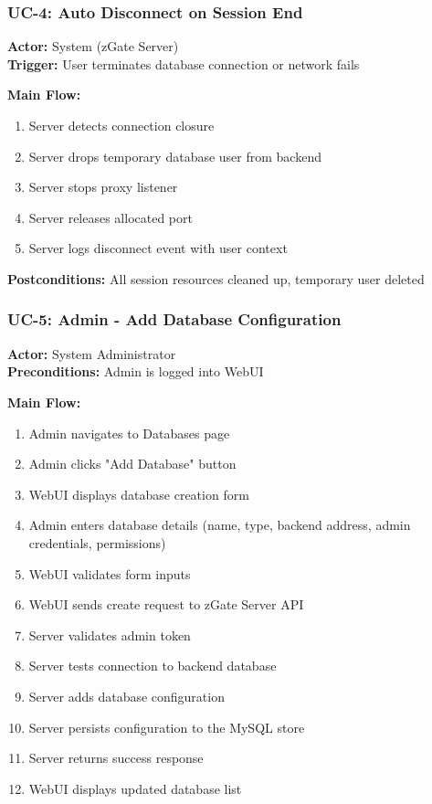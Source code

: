 \subsubsection{UC-4: Auto Disconnect on Session End}
\textbf{Actor:} System (zGate Server) \\
\textbf{Trigger:} User terminates database connection or network fails

\textbf{Main Flow:}
\begin{enumerate}
    \item Server detects connection closure
    \item Server drops temporary database user from backend
    \item Server stops proxy listener
    \item Server releases allocated port
    \item Server logs disconnect event with user context
\end{enumerate}

\textbf{Postconditions:} All session resources cleaned up, temporary user deleted

\subsubsection{UC-5: Admin - Add Database Configuration}
\textbf{Actor:} System Administrator \\
\textbf{Preconditions:} Admin is logged into WebUI

\textbf{Main Flow:}
\begin{enumerate}
    \item Admin navigates to Databases page
    \item Admin clicks "Add Database" button
    \item WebUI displays database creation form
    \item Admin enters database details (name, type, backend address, admin credentials, permissions)
    \item WebUI validates form inputs
    \item WebUI sends create request to zGate Server API
    \item Server validates admin token
    \item Server tests connection to backend database
    \item Server adds database configuration
    \item Server persists configuration to the MySQL store
    \item Server returns success response
    \item WebUI displays updated database list
\end{enumerate}

